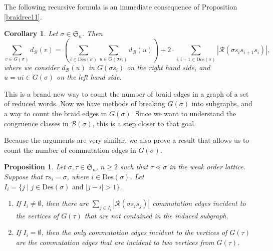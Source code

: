 \documentclass[11pt,reqno]{amsart}
\newtheorem{proposition}[theorem]{Proposition}
\newtheorem{corollary}[theorem]{Corollary}
\theoremstyle{definition}
\theoremstyle{notation}
\newcommand{\Des}{\text{Des}}
\newcommand{\calR}{\mathcal{R}}
\newcommand{\calB}{\mathcal{B}}
\begin{document}
The following recursive formula is an immediate consequence of Proposition \ref{braidrec11}.

\begin{corollary}\label{recDEG}
Let $\sigma \in \mathfrak{S}_n$. Then
\[
\sum_{v\in G(\sigma)} d_\calB(v) =\left ( \sum_{i\in \Des(\sigma)}\sum_{u\in G(\sigma s_i)}d_\calB(u) \right )+ 2 \cdot \sum_{i,i+1\in \Des(\sigma)}|\calR(\sigma s_is_{i+1}s_i)|,
\]
where we consider $d_\calB(u)$ in $G(\sigma s_i)$ on the right hand side, and $\overline{u}=ui \in G(\sigma)$ on the left hand side.
\end{corollary}

This is a brand new way to count the number of braid edges in a graph of a set of reduced words. Now we have methods of breaking $G(\sigma)$ into subgraphs, and a way to count the braid edges in $G(\sigma)$. Since we want to understand the congruence classes in $\calB(\sigma)$, this is a step closer to that goal.

Because the arguments are very similar, we also prove a result that allows us to count the number of commutation edges in $G(\sigma)$. 

\begin{proposition}\label{braidedge10}
Let $\sigma, \tau \in \mathfrak{S}_n$, $n\geq 2$ such that $\tau \lessdot \sigma $ in the weak order lattice. Suppose that $\tau s_i = \sigma$, where $i\in \Des(\sigma)$. Let $I_i = \{j\mid j\in \Des(\sigma) \mbox{ and } |j-i|>1 \} $.
\begin{enumerate}
\item If $I_i \neq \emptyset$,  then there are $\sum_{j\in I_i}|\calR(\sigma s_is_j)|$ commutation edges incident to the vertices of $G(\tau)$ that are not contained in the induced subgraph. 
\item If $I_i = \emptyset$, then the only commutation edges incident to the vertices of $G(\tau)$ are the commutation edges that are incident to two vertices from $G(\tau)$.  
\end{enumerate}
\end{proposition}
\end{document}
